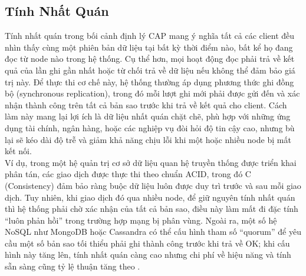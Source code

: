 \documentclass[conference]{IEEEtran}
\begin{document}
\subsection{Tính Nhất Quán}
Tính nhất quán trong bối cảnh định lý CAP mang ý nghĩa tất cả các client đều nhìn thấy cùng một phiên bản dữ liệu tại bất kỳ thời điểm nào, bất kể họ đang đọc từ node nào trong hệ thống. Cụ thể hơn, mọi hoạt động đọc phải trả về kết quả của lần ghi gần nhất hoặc từ chối trả về dữ liệu nếu không thể đảm bảo giá trị này. Để thực thi cơ chế này, hệ thống thường áp dụng phương thức ghi đồng bộ (synchronous replication), trong đó mỗi lượt ghi mới phải được gửi đến và xác nhận thành công trên tất cả bản sao trước khi trả về kết quả cho client. Cách làm này mang lại lợi ích là dữ liệu nhất quán chặt chẽ, phù hợp với những ứng dụng tài chính, ngân hàng, hoặc các nghiệp vụ đòi hỏi độ tin cậy cao, nhưng bù lại sẽ kéo dài độ trễ và giảm khả năng chịu lỗi khi một hoặc nhiều node bị mất kết nối.\\
Ví dụ, trong một hệ quản trị cơ sở dữ liệu quan hệ truyền thống được triển khai phân tán, các giao dịch được thực thi theo chuẩn ACID, trong đó C (Consistency) đảm bảo ràng buộc dữ liệu luôn được duy trì trước và sau mỗi giao dịch. Tuy nhiên, khi giao dịch đó qua nhiều node, để giữ nguyên tính nhất quán thì hệ thống phải chờ xác nhận của tất cả bản sao, điều này làm mất đi đặc tính “luôn phản hồi” trong trường hợp mạng bị phân vùng. Ngoài ra, một số hệ NoSQL như MongoDB hoặc Cassandra có thể cấu hình tham số “quorum” để yêu cầu một số bản sao tối thiểu phải ghi thành công trước khi trả về OK; khi cấu hình này tăng lên, tính nhất quán càng cao nhưng chi phí về hiệu năng và tính sẵn sàng cũng tỷ lệ thuận tăng theo \cite{cassandradocs,mongobook}.
\end{document}
